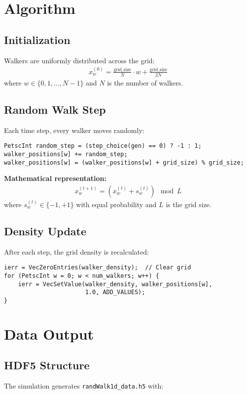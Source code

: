 \documentclass[11pt,a4paper]{article}
\begin{document}
\section{Algorithm}

\subsection{Initialization}
Walkers are uniformly distributed across the grid:
\begin{align}
x_w^{(0)} = \frac{\text{grid\_size}}{N} \cdot w + \frac{\text{grid\_size}}{2N}
\end{align}
where $w \in \{0, 1, ..., N-1\}$ and $N$ is the number of walkers.

\subsection{Random Walk Step}
Each time step, every walker moves randomly:
\begin{lstlisting}[caption=Single random step]
PetscInt random_step = (step_choice(gen) == 0) ? -1 : 1;
walker_positions[w] += random_step;
walker_positions[w] = (walker_positions[w] + grid_size) % grid_size;
\end{lstlisting}

\textbf{Mathematical representation:}
\begin{align}
x_w^{(t+1)} = (x_w^{(t)} + s_w^{(t)}) \mod L
\end{align}
where $s_w^{(t)} \in \{-1, +1\}$ with equal probability and $L$ is the grid size.

\subsection{Density Update}
After each step, the grid density is recalculated:
\begin{lstlisting}[caption=Density vector update]
ierr = VecZeroEntries(walker_density);  // Clear grid
for (PetscInt w = 0; w < num_walkers; w++) {
    ierr = VecSetValue(walker_density, walker_positions[w], 
                       1.0, ADD_VALUES);
}
\end{lstlisting}

\section{Data Output}

\subsection{HDF5 Structure}
The simulation generates \texttt{randWalk1d\_data.h5} with:
\end{document}
